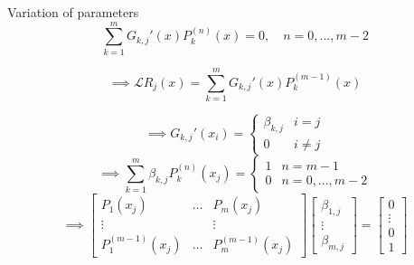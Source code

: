 \documentclass{beamer}
\begin{document}
\begin{frame}
\begin{block}{Variation of parameters}
\begin{equation*}
\sum_{k=1}^m G_{k,j}'(x) P_k^{(n)}(x) = 0, \quad n = 0,...,m-2
\end{equation*}
\end{block}
\begin{equation*}
\implies \mathcal{L} R_j(x) = \sum_{k=1}^m G_{k,j}'(x) P_k^{(m-1)}(x)
\end{equation*}
\end{frame}

\begin{frame}
\begin{equation*}
\implies G_{k,j}'(x_i) = \begin{cases} \beta_{k,j} & i = j \\ 0 & i \neq j \end{cases}
\end{equation*}
\begin{equation*}
\implies \sum_{k=1}^m \beta_{k,j} P_k^{(n)}(x_j) = \begin{cases} 1 & n = m-1 \\ 0 & n = 0,...,m-2 \end{cases}
\end{equation*}
\begin{equation*}
\implies \begin{bmatrix} P_1(x_j) & \dots & P_m(x_j) \\ \vdots & & \vdots \\ P_1^{(m-1)}(x_j) & \dots & P_m^{(m-1)}(x_j) \end{bmatrix} \begin{bmatrix} \beta_{1,j} \\ \vdots \\ \beta_{m,j} \end{bmatrix} = \begin{bmatrix} 0 \\ \vdots \\ 0 \\ 1 \end{bmatrix}
\end{equation*}
\end{frame}
\end{document}
